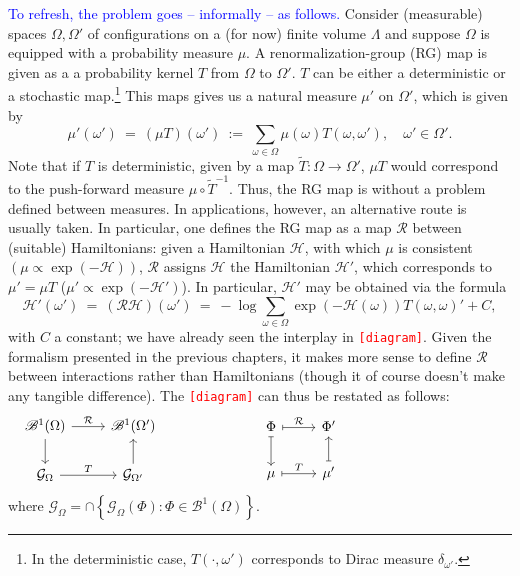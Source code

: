 \documentclass[12pt]{article}
\newcommand{\BB}{\mathscr{B}}
\newcommand{\G}{\mathcal{G}}
\renewcommand{\H}{\mathcal{H}}
\newcommand{\RR}{\mathcal{R}}
\newcommand{\set}[1]{\left\{#1\right\}}
\newcommand{\ra}{\rightarrow}
\newcommand{\pika}{\boldsymbol{\cdot}}
\newcommand{\1}{\mathbbm{1}}
\newcommand{\5}{\vspace{0.5cm}}
\renewcommand{\tilde}{\widetilde}
\theoremstyle{definition}
\begin{document}
\textcolor{blue}{To refresh, the problem goes -- informally -- as follows.} Consider (measurable) spaces $\Omega,\Omega'$ of configurations on a (for now) finite volume $\Lambda$ and suppose $\Omega$ is equipped with a probability measure $\mu$. A renormalization-group (RG) map is given as a a probability kernel $T$ from $\Omega$ to $\Omega'$. $T$ can be either a deterministic or a stochastic map.\footnote{In the deterministic case, $T(\pika,\omega')$ corresponds to Dirac measure $\delta_{\omega'}$.} This maps gives us a natural measure $\mu'$ on $\Omega'$, which is given by
$$\mu'(\omega') ~=~ (\mu T)(\omega') ~:=~ \sum_{\omega\in\Omega}\mu(\omega)T(\omega,\omega'), \quad \omega'\in\Omega'.$$
Note that if $T$ is deterministic, given by a map $\tilde{T}:\Omega\ra\Omega'$, $\mu T$ would correspond to the push-forward measure $\mu\circ \tilde{T}^{-1}$. Thus, the RG map is without a problem defined between measures. In applications, however, an alternative route is usually taken. In particular, one defines the RG map as a map $\RR$ between (suitable) Hamiltonians: given a Hamiltonian $\H$, with which $\mu$ is consistent $(\mu\propto \exp(-\H))$, $\RR$ assigns $\H$ the Hamiltonian $\H'$, which corresponds to $\mu'=\mu T$ ($\mu'\propto \exp(-\H')$). In particular, $\H'$ may be obtained via the formula
$$\H'(\omega') ~=~ (\RR\H)(\omega') ~=~ -\log\sum_{\omega\in\Omega} \exp(-\H(\omega))T(\omega,\omega)' + C,$$
with $C$ a constant; we have already seen the interplay in \textcolor{red}{\texttt{[diagram]}}. Given the formalism presented in the previous chapters, it makes more sense to define $\RR$ between interactions rather than Hamiltonians (though it of course doesn't make any tangible difference). The \textcolor{red}{\texttt{[diagram]}} can thus be restated as follows:
$$\begin{minipage}{0.5\textwidth}
\begin{tikzcd}
    \BB^1(\Omega) \arrow[r, "\RR"] \arrow[d] & \BB^1(\Omega')  \\
    \G_\Omega \arrow[r, "T"] & \G_{\Omega'} \arrow[u]
\end{tikzcd}
\end{minipage}
\begin{minipage}{0.5\textwidth}
\begin{tikzcd}
    \Phi \arrow[r, mapsto, "\RR"] \arrow[d, mapsto] & \Phi' \\
    \mu \arrow[r, mapsto, "T"] & \mu' \arrow[u, mapsto]
\end{tikzcd}
\end{minipage}$$
where $\G_\Omega=\cap\set{\G_{\Omega}(\Phi):\Phi\in\BB^1(\Omega)}$. \\
\end{document}
